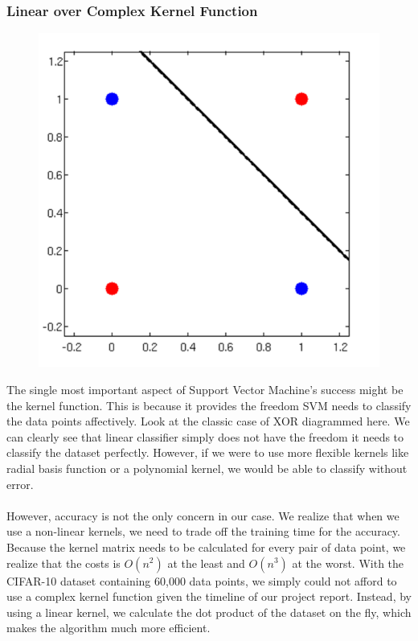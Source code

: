 \documentclass[12pt, a4paper]{article}
\begin{document}
			\subsubsection{Linear over Complex Kernel Function}
				\begin{figure}
					\centering\includegraphics[width=0.5\linewidth]{../figures/xor.png}
				\end{figure}
				The single most important aspect of Support Vector Machine's success might be the kernel function. This is because it provides the freedom SVM needs to classify the data points affectively. Look at the classic case of XOR diagrammed here. We can clearly see that linear classifier simply does not have the freedom it needs to classify the dataset perfectly. However, if we were to use more flexible kernels like radial basis function or a polynomial kernel, we would be able to classify without error.\\\\
				However, accuracy is not the only concern in our case. We realize that when we use a non-linear kernels, we need to trade off the training time for the accuracy. Because the kernel matrix needs to be calculated for every pair of data point, we realize that the costs is $O(n^2)$ at the least and $O(n^3)$ at the worst. With the CIFAR-10 dataset containing 60,000 data points, we simply could not afford to use a complex kernel function given the timeline of our project report. Instead, by using a linear kernel, we calculate the dot product of the dataset on the fly, which makes the algorithm much more efficient.
\end{document}

